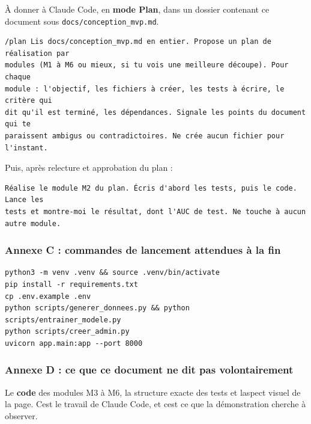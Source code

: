 \documentclass[
  french,
  11pt,
  a4paper,
]{article}
\begin{document}
À donner à Claude Code, en \textbf{mode Plan}, dans un dossier contenant
ce document sous
\texttt{docs/\allowbreak{}conception\_\allowbreak{}mvp.\allowbreak{}md}.

\begin{Verbatim}[breaklines=true,breakanywhere=true,fontsize=\small,frame=leftline,framerule=1.6pt,rulecolor=\color{credixblue},framesep=3mm,xleftmargin=2mm,xrightmargin=1mm]
/plan Lis docs/conception_mvp.md en entier. Propose un plan de réalisation par
modules (M1 à M6 ou mieux, si tu vois une meilleure découpe). Pour chaque
module : l'objectif, les fichiers à créer, les tests à écrire, le critère qui
dit qu'il est terminé, les dépendances. Signale les points du document qui te
paraissent ambigus ou contradictoires. Ne crée aucun fichier pour l'instant.
\end{Verbatim}

Puis, après relecture et approbation du plan :

\begin{Verbatim}[breaklines=true,breakanywhere=true,fontsize=\small,frame=leftline,framerule=1.6pt,rulecolor=\color{credixblue},framesep=3mm,xleftmargin=2mm,xrightmargin=1mm]
Réalise le module M2 du plan. Écris d'abord les tests, puis le code. Lance les
tests et montre-moi le résultat, dont l'AUC de test. Ne touche à aucun autre module.
\end{Verbatim}

\subsubsection{Annexe C : commandes de lancement attendues à la
fin}\label{annexe-c--commandes-de-lancement-attendues-uxe0-la-fin}

\begin{Verbatim}[breaklines=true,breakanywhere=true,fontsize=\small,frame=leftline,framerule=1.6pt,rulecolor=\color{credixblue},framesep=3mm,xleftmargin=2mm,xrightmargin=1mm]
python3 -m venv .venv && source .venv/bin/activate
pip install -r requirements.txt
cp .env.example .env
python scripts/generer_donnees.py && python scripts/entrainer_modele.py
python scripts/creer_admin.py
uvicorn app.main:app --port 8000
\end{Verbatim}

\subsubsection{Annexe D : ce que ce document ne dit pas
volontairement}\label{annexe-d--ce-que-ce-document-ne-dit-pas-volontairement}

Le \textbf{code} des modules M3 à M6, la structure exacte des tests et
l\textquotesingle aspect visuel de la page. C\textquotesingle est le
travail de Claude Code, et c\textquotesingle est ce que la démonstration
cherche à observer.
\end{document}

